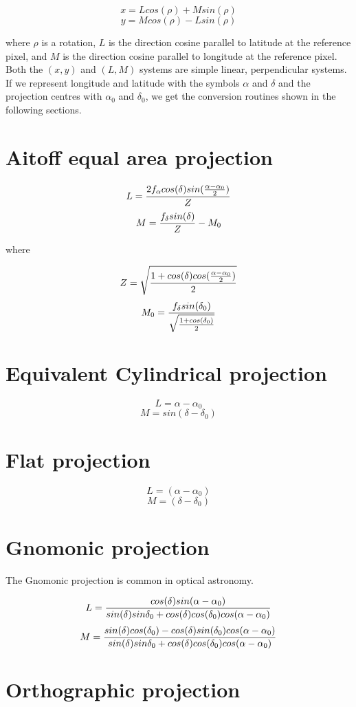 $$x = L cos(\rho) + M sin(\rho)$$
$$y = M cos(\rho) - L sin(\rho)$$

where $\rho$ is a rotation, $L$ is the direction cosine parallel to
latitude at the reference pixel, and $M$ is the direction cosine
parallel to longitude at the reference pixel.  Both the $(x,y)$ and
$(L,M)$ systems are simple linear, perpendicular systems.  If we
represent longitude and latitude with the symbols $\alpha$ and $\delta$
and the projection centres with $\alpha_0$ and $\delta_0$, we get the
conversion routines shown in the following sections. 
 
\section{Aitoff equal area projection}

$$L = {{2 f_\alpha cos(\delta) sin({{\alpha-\alpha_0}\over{2}})}\over{Z}}$$
$$M = {{f_\delta sin(\delta)}\over{Z}} - M_0$$

where

$$Z = \sqrt{{1 + cos(\delta) cos({{\alpha-\alpha_0}\over{2}})}\over{2}}$$
$$M_0 = {{f_\delta sin(\delta_0)}\over{\sqrt{{{1 + cos(\delta_0)}\over{2}}}}}$$

\section{Equivalent Cylindrical projection}

$$L = \alpha - \alpha_0$$
$$M = sin(\delta-\delta_0)$$

\section{Flat projection}

$$L = (\alpha - \alpha_0)$$
$$M = (\delta - \delta_0)$$

\section{Gnomonic projection}

The Gnomonic projection is common in optical astronomy.

$$L = {{cos(\delta) sin(\alpha-\alpha_0)}\over{sin(\delta) sin{\delta_0} + cos(\delta) cos(\delta_0) cos(\alpha-\alpha_0)}}$$
$$M = {{sin(\delta) cos(\delta_0) - cos(\delta) sin(\delta_0) cos(\alpha-\alpha_0)}\over{sin(\delta) sin{\delta_0} + cos(\delta) cos(\delta_0) cos(\alpha-\alpha_0)}}$$

\section{Orthographic projection}

